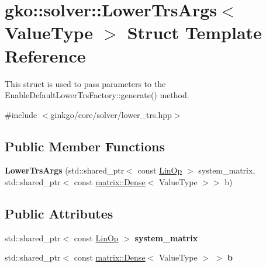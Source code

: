 \hypertarget{structgko_1_1solver_1_1LowerTrsArgs}{}\section{gko\+:\+:solver\+:\+:Lower\+Trs\+Args$<$ Value\+Type $>$ Struct Template Reference}
\label{structgko_1_1solver_1_1LowerTrsArgs}


This struct is used to pass parameters to the Enable\+Default\+Lower\+Trs\+Factory\+::generate() method.  




{\ttfamily \#include $<$ginkgo/core/solver/lower\+\_\+trs.\+hpp$>$}

\subsection*{Public Member Functions}
\begin{DoxyCompactItemize}
\item 
\mbox{\label{structgko_1_1solver_1_1LowerTrsArgs_a12c61882caa7db247604f262012897aa}} 
{\bfseries Lower\+Trs\+Args} (std\+::shared\+\_\+ptr$<$ const \hyperlink{classgko_1_1LinOp}{Lin\+Op} $>$ system\+\_\+matrix, std\+::shared\+\_\+ptr$<$ const \hyperlink{classgko_1_1matrix_1_1Dense}{matrix\+::\+Dense}$<$ Value\+Type $>$$>$ b)
\end{DoxyCompactItemize}
\subsection*{Public Attributes}
\begin{DoxyCompactItemize}
\item 
\mbox{\label{structgko_1_1solver_1_1LowerTrsArgs_a61f302c08a911de54daf44a21d5b74f4}} 
std\+::shared\+\_\+ptr$<$ const \hyperlink{classgko_1_1LinOp}{Lin\+Op} $>$ {\bfseries system\+\_\+matrix}
\item 
\mbox{\label{structgko_1_1solver_1_1LowerTrsArgs_ace8287e704fba35248fa6645a34b20d5}} 
std\+::shared\+\_\+ptr$<$ const \hyperlink{classgko_1_1matrix_1_1Dense}{matrix\+::\+Dense}$<$ Value\+Type $>$ $>$ {\bfseries b}
\end{DoxyCompactItemize}


